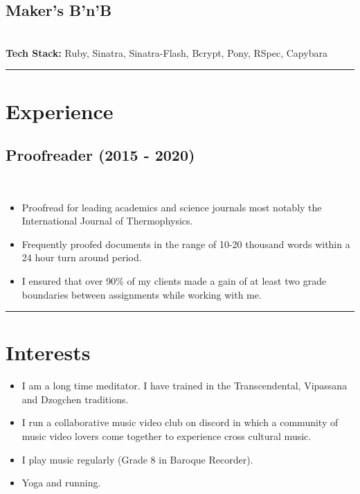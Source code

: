 \documentclass[12pt]{IEEEtran}
\newcommand{\cvrule}{\noindent\rule{8.5cm}{0.4pt}}
\begin{document}
\subsection*{Maker's B'n'B}
 \\
\textbf{Tech Stack:} Ruby, Sinatra, Sinatra-Flash, Bcrypt, Pony, RSpec, Capybara %

\cvrule
\vskip 0.35in

\section*{\textbf{Experience}}

\subsection*{Proofreader (2015 - 2020)}
\\[1pt]
\begin{itemize}
\item Proofread for leading academics and science journals most notably the International Journal of Thermophysics.
\item Frequently proofed documents in the range of 10-20 thousand words within a 24 hour turn around period.
\item I ensured that over 90\% of my clients made a gain of at least two grade boundaries between assignments while working with me.
\end{itemize}

\cvrule
\vskip 0.35in
\section*{I\textbf{nterests}}

\begin{itemize}
\item I am a long time meditator. I have trained in the Transcendental, Vipassana and Dzogchen traditions.
\item I run a collaborative music video club on discord in which a community of music video lovers come together to experience cross cultural music.
\item I play music regularly (Grade 8 in Baroque Recorder).
\item Yoga and running.
\end{itemize}
\end{document}
